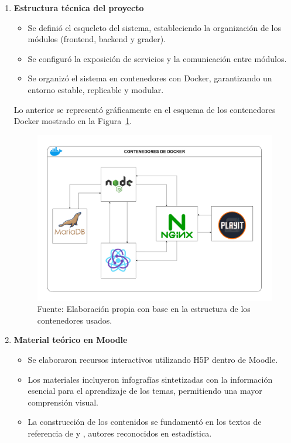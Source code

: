 \documentclass[letter,oneside,12pt,spanish]{report}
\begin{document}
\begin{enumerate}
	\item \textbf{Estructura técnica del proyecto}
	\begin{itemize}
		\item Se definió el esqueleto del sistema, estableciendo la organización de los módulos (frontend, backend y grader).
		\item Se configuró la exposición de servicios y la comunicación entre módulos.
		\item Se organizó el sistema en contenedores con Docker, garantizando un entorno estable, replicable y modular.
	\end{itemize}
	
	\noindent Lo anterior se representó gráficamente en el esquema de los contenedores Docker mostrado en la Figura~\ref{fig:Diagrama-Docker}.
	
	\begin{figure}[ht]
		\centering
		\includegraphics[width=1\textwidth]{Figs/Diagrama_contenedores.pdf}
		\label{fig:Diagrama-Docker}
		\\Fuente: Elaboración propia con base en la estructura de los contenedores usados.
	\end{figure}
	\newpage
	\item \textbf{Material teórico en Moodle}
	\begin{itemize}
		\item Se elaboraron recursos interactivos utilizando H5P dentro de Moodle.
		\item Los materiales incluyeron infografías sintetizadas con la información esencial para el aprendizaje de los temas, permitiendo una mayor comprensión visual.
		\item La construcción de los contenidos se fundamentó en los textos de referencia de \textcite{montgomery1996} y \textcite{walpole2012probabilidad}, autores reconocidos en estadística.
	\end{itemize}
	

\end{enumerate}
\end{document}
